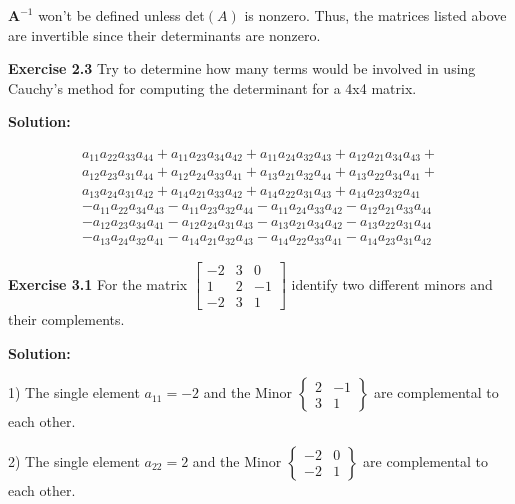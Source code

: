 \documentclass[12pt]{article}
\newcommand{\sol} {\textbf{Solution:}}
\newcommand{\A} {\mathbf{A}}
\begin{document}
\(\A^{-1}\) won't be defined unless det\((A)\) is nonzero.
Thus, the matrices listed above are invertible since their determinants are nonzero.

\bigskip

\noindent\textbf{Exercise 2.3 }Try to determine how many terms would be
involved in using Cauchy's method for computing the determinant for a 4x4 matrix.

\sol

\[
\begin{matrix}
  a_{11} a_{22} a_{33} a_{44} +
  a_{11} a_{23} a_{34} a_{42} +
  a_{11} a_{24} a_{32} a_{43} +
  a_{12} a_{21} a_{34} a_{43} + \\
  a_{12} a_{23} a_{31} a_{44} +
  a_{12} a_{24} a_{33} a_{41} +
  a_{13} a_{21} a_{32} a_{44} +
  a_{13} a_{22} a_{34} a_{41} + \\
  a_{13} a_{24} a_{31} a_{42} +
  a_{14} a_{21} a_{33} a_{42} +
  a_{14} a_{22} a_{31} a_{43} +
  a_{14} a_{23} a_{32} a_{41} \\
  - a_{11} a_{22} a_{34} a_{43}
  - a_{11} a_{23} a_{32} a_{44}
  - a_{11} a_{24} a_{33} a_{42}
  - a_{12} a_{21} a_{33} a_{44} \\
  - a_{12} a_{23} a_{34} a_{41}
  - a_{12} a_{24} a_{31} a_{43}
  - a_{13} a_{21} a_{34} a_{42}
  - a_{13} a_{22} a_{31} a_{44} \\
  - a_{13} a_{24} a_{32} a_{41}
  - a_{14} a_{21} a_{32} a_{43}
  - a_{14} a_{22} a_{33} a_{41}
  - a_{14} a_{23} a_{31} a_{42}
\end{matrix}
\]

\bigskip

\noindent\textbf{Exercise 3.1} For the matrix $%
\begin{bmatrix}
-2 & 3 & 0\\
1 & 2 & -1\\
-2 & 3 & 1
\end{bmatrix}
$ identify two different minors and their complements.

\bigskip

\sol

1) The single element \(a_{11} = -2\) and the Minor
\(
\begin{Bmatrix}
2 & -1 \\
3 & 1
\end{Bmatrix}
\)
are complemental to each other.

2) The single element \(a_{22} = 2\) and the Minor
\(
\begin{Bmatrix}
-2 & 0 \\
-2 & 1
\end{Bmatrix}
\)
are complemental to each other.
\end{document}
